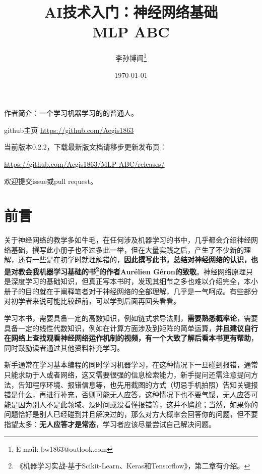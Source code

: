 \documentclass[a5paper, 11pt]{ctexbook}
\title{\textbf{\huge AI技术入门：神经网络基础 \\ \Large MLP ABC}}
\author{李孙博闻\thanks{E-mail: bw1863@outlook.com}}
\date{\today}
\begin{document}
\maketitle



作者简介：一个学习机器学习的的普通人。

github主页 \href{https://github.com/Aegis1863} {https://github.com/Aegis1863}

当前版本0.2.2，下载最新版文档请移步更新发布页：

\href{https://github.com/Aegis1863/MLP-ABC/releases/}{https://github.com/Aegis1863/MLP-ABC/releases/}

欢迎提交issue或pull request。


\chapter*{前言} %


关于神经网络的教学多如牛毛，在任何涉及机器学习的书中，几乎都会介绍神经网络基础，撰写此小册子也不过多此一举，但在大量实践之后，产生了不少新的理解，还有一些是在初学时就理解错的，\textbf{因此撰写此书，总结对神经网络的认识，也是对教会我机器学习基础的书\footnote{《机器学习实战-基于Scikit-Learn、Keras和Tensorflow》，第二章有介绍。}的作者Aurélien Géron的致敬}。神经网络原理只是深度学习的基础知识，但真正写本书时，发现其细节之多也难以介绍完全，本小册子的目的就在于阐释笔者对于神经网络的全部理解，几乎是一气呵成。有些部分对初学者来说可能比较超前，可以学到后面再回头看看。

学习本书，需要具备一定的高数知识，例如链式求导法则，\textbf{需要熟悉概率论}，需要具备一定的线性代数知识，例如在计算方面涉及到矩阵的简单运算，\textbf{并且建议自行在网络上查找观看神经网络运作机制的视频，有一个大致了解后看本书更有帮助}，同时鼓励读者通过其他资料补充学习。

新手通常在学习基本编程的同时学习机器学习，在这种情况下一旦碰到报错，通常只能求助于人或者网络，这又需要很强的信息检索能力，新手提问还需注意提问方法，告知程序环境、报错信息等，也先用截图的方式（切忌手机拍照）告知关键报错是什么，再进行补充，否则可能无人应答，这种情况下也不要气馁，无人应答可能是因为别人不是此领域、没时间或没看懂报错等，这并不尴尬；当然，如果你的问题恰好是别人已经碰到并且解决过的，那么对方大概率会回答你的问题，但不要指望太多：\textbf{无人应答才是常态}，学习者应该尽量尝试自己解决问题。
\end{document}
